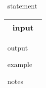 \documentclass[pl]{sim-statement} %
\date{}
\begin{document}
\begin{statement}

~statement~

\begin{center}
	\begin{tabular}{|p{13cm}|}
	\hline
~input~
	\\ \hline
	\end{tabular}
\end{center}

~output~

\begin{samples} 
~example~
\end{samples}

\begin{grading}
\end{grading}

~notes~

\end{statement}
\end{document}
